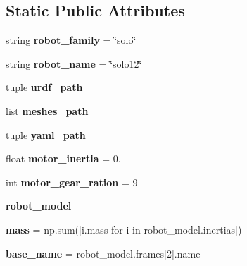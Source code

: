 \subsection*{Static Public Attributes}
\begin{DoxyCompactItemize}
\item 
string {\bfseries robot\+\_\+family} = \char`\"{}solo\char`\"{}\hypertarget{classrobot__properties__solo_1_1config_1_1Solo12Config_a3a6ac10f7f9e5d67ce2390cdfd2b2e2a}{}\label{classrobot__properties__solo_1_1config_1_1Solo12Config_a3a6ac10f7f9e5d67ce2390cdfd2b2e2a}

\item 
string {\bfseries robot\+\_\+name} = \char`\"{}solo12\char`\"{}\hypertarget{classrobot__properties__solo_1_1config_1_1Solo12Config_a4c2ad56cfc7c1e30568273bdbed5ac63}{}\label{classrobot__properties__solo_1_1config_1_1Solo12Config_a4c2ad56cfc7c1e30568273bdbed5ac63}

\item 
tuple {\bfseries urdf\+\_\+path}
\item 
list {\bfseries meshes\+\_\+path}
\item 
tuple {\bfseries yaml\+\_\+path}
\item 
float {\bfseries motor\+\_\+inertia} = 0.\hypertarget{classrobot__properties__solo_1_1config_1_1Solo12Config_abeb949a51a89f8c137492f71c9896c8f}{}\label{classrobot__properties__solo_1_1config_1_1Solo12Config_abeb949a51a89f8c137492f71c9896c8f}

\item 
int {\bfseries motor\+\_\+gear\+\_\+ration} = 9\hypertarget{classrobot__properties__solo_1_1config_1_1Solo12Config_a9d6b5c60458887bd15abc40c31794d94}{}\label{classrobot__properties__solo_1_1config_1_1Solo12Config_a9d6b5c60458887bd15abc40c31794d94}

\item 
{\bfseries robot\+\_\+model}
\item 
{\bfseries mass} = np.\+sum(\mbox{[}i.\+mass for i in robot\+\_\+model.\+inertias\mbox{]})\hypertarget{classrobot__properties__solo_1_1config_1_1Solo12Config_a1cbf9f73f9aea2129ae9c03e85f7aebb}{}\label{classrobot__properties__solo_1_1config_1_1Solo12Config_a1cbf9f73f9aea2129ae9c03e85f7aebb}

\item 
{\bfseries base\+\_\+name} = robot\+\_\+model.\+frames\mbox{[}2\mbox{]}.name\hypertarget{classrobot__properties__solo_1_1config_1_1Solo12Config_a08164d8a2fad7463dc5f910d25500c7d}{}\label{classrobot__properties__solo_1_1config_1_1Solo12Config_a08164d8a2fad7463dc5f910d25500c7d}


\end{DoxyCompactItemize}
